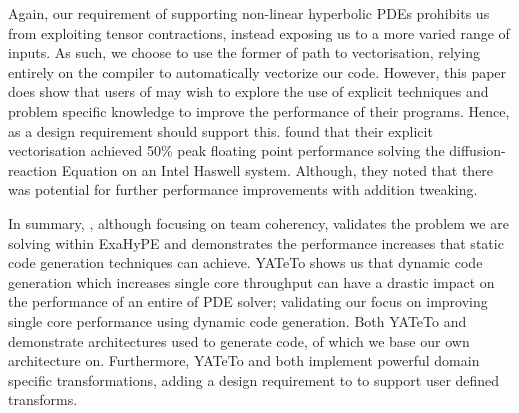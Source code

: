 Again, our requirement of supporting non-linear hyperbolic PDEs prohibits us from exploiting tensor contractions, instead exposing us to a more varied range of inputs.
As such, we choose to use the former of  \citeauthor{codegen_dg_SIMD} path to vectorisation, relying entirely on the compiler to automatically vectorize our code.
However, this paper does show that users of \phlat may wish to explore the use of explicit techniques and problem specific knowledge to improve the performance of their programs.
Hence, as a design requirement \phlat should support this.
\citeauthor{codegen_dg_SIMD} found that their explicit vectorisation achieved 50\% peak floating point performance solving the diffusion-reaction Equation on an Intel Haswell system.
Although, they noted that there was potential for further performance improvements with addition tweaking.

In summary, \citeauthor{templateExahype}, although focusing on team coherency, validates the problem we are solving within ExaHyPE and demonstrates the performance increases that static code generation techniques can achieve.
YATeTo shows us that dynamic code generation which increases single core throughput can have a drastic impact on the performance of an entire of PDE solver; validating our focus on improving single core performance using dynamic code generation.
Both YATeTo and \citeauthor{codegen_dg_SIMD} demonstrate architectures used to generate code, of which we base our own architecture on.
Furthermore, YATeTo and \citeauthor{codegen_dg_SIMD} both implement powerful domain specific transformations, adding a design requirement to \phlat to support user defined transforms.  